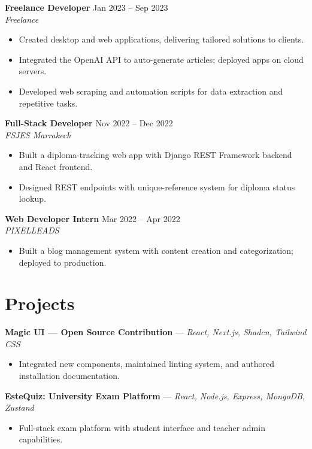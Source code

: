 \documentclass[11pt,a4paper]{article}
\begin{document}
\vspace{2pt}
{\small
\textbf{Freelance Developer} \hfill Jan 2023 -- Sep 2023 \\
\textit{Freelance}}
\begin{itemize}[leftmargin=12pt]
  \item {\small Created desktop and web applications, delivering tailored solutions to clients.}
  \item {\small Integrated the OpenAI API to auto-generate articles; deployed apps on cloud servers.}
  \item {\small Developed web scraping and automation scripts for data extraction and repetitive tasks.}
\end{itemize}

\vspace{2pt}
{\small
\textbf{Full-Stack Developer} \hfill Nov 2022 -- Dec 2022 \\
\textit{FSJES Marrakech}}
\begin{itemize}[leftmargin=12pt]
  \item {\small Built a diploma-tracking web app with Django REST Framework backend and React frontend.}
  \item {\small Designed REST endpoints with unique-reference system for diploma status lookup.}
\end{itemize}

\vspace{2pt}
{\small
\textbf{Web Developer Intern} \hfill Mar 2022 -- Apr 2022 \\
\textit{PIXELLEADS}}
\begin{itemize}[leftmargin=12pt]
  \item {\small Built a blog management system with content creation and categorization; deployed to production.}
\end{itemize}

\section{Projects}

{\small
\textbf{Magic UI --- Open Source Contribution} --- \textit{React, Next.js, Shadcn, Tailwind CSS}}
\begin{itemize}[leftmargin=12pt]
  \item {\small Integrated new components, maintained linting system, and authored installation documentation.}
\end{itemize}

\vspace{2pt}
{\small
\textbf{EsteQuiz: University Exam Platform} --- \textit{React, Node.js, Express, MongoDB, Zustand}}
\begin{itemize}[leftmargin=12pt]
  \item {\small Full-stack exam platform with student interface and teacher admin capabilities.}
\end{itemize}
\end{document}
